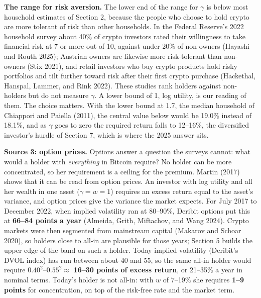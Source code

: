 \documentclass[11pt]{article}
\begin{document}
\textbf{The range for risk aversion.} The lower end of the range for $\gamma$ is below most household estimates of Section 2, because the people who choose to hold crypto are more tolerant of risk than other households. In the Federal Reserve's 2022 household survey about 40\% of crypto investors rated their willingness to take financial risk at 7 or more out of 10, against under 20\% of non-owners (Hayashi and Routh 2025); Austrian owners are likewise more risk-tolerant than non-owners (Stix 2021), and retail investors who buy crypto products hold risky portfolios and tilt further toward risk after their first crypto purchase (Hackethal, Hanspal, Lammer, and Rink 2022). These studies rank holders against non-holders but do not measure $\gamma$. A lower bound of 1, log utility, is our reading of them. The choice matters. With the lower bound at 1.7, the median household of Chiappori and Paiella (2011), the central value below would be 19.0\% instead of 18.1\%, and as $\gamma$ goes to zero the required return falls to 12--16\%, the diversified investor's hurdle of Section 7, which is where the 2025 answer sits.

\textbf{Source 3: option prices.} Options answer a question the surveys cannot: what would a holder with \emph{everything} in Bitcoin require? No holder can be more concentrated, so her requirement is a ceiling for the premium. Martin (2017) shows that it can be read from option prices. An investor with log utility and all her wealth in one asset ($\gamma = w = 1$) requires an excess return equal to the asset's variance, and option prices give the variance the market expects. For July 2017 to December 2022, when implied volatility ran at 80--90\%, Deribit options put this at \textbf{66--84 points a year} (Almeida, Grith, Miftachov, and Wang 2024). Crypto markets were then segmented from mainstream capital (Makarov and Schoar 2020), so holders close to all-in are plausible for those years; Section 5 builds the upper edge of the band on such a holder. Today implied volatility (Deribit's DVOL index) has run between about 40 and 55, so the same all-in holder would require $0.40^2$--$0.55^2 \approx$ \textbf{16--30 points of excess return}, or 21--35\% a year in nominal terms. Today's holder is not all-in: with $w$ of 7--19\% she requires \textbf{1--9 points} for concentration, on top of the risk-free rate and the market term.
\end{document}
